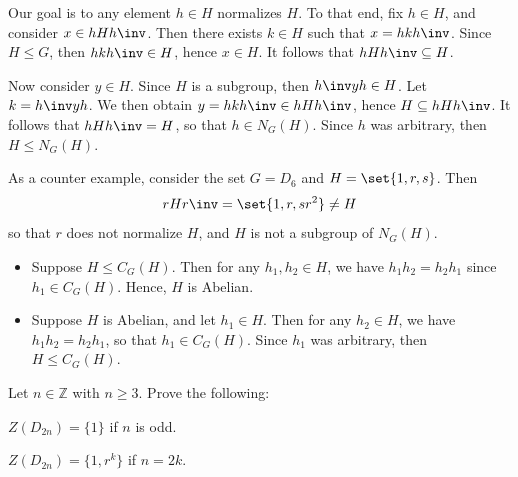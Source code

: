 \begin{solalph}
    \item Our goal is to any element $h \in H$ normalizes $H$. To that end, fix $h \in H$, and consider $x \in hHh\inv$. Then there exists $k \in H$ such that $x = hkh\inv$. Since $H \leq G$, then $hkh\inv \in H$, hence $x \in H$. It follows that $hHh\inv \subseteq H$.
    
    Now consider $y \in H$. Since $H$ is a subgroup, then $h\inv y h \in H$. Let $k = h\inv yh$. We then obtain $y = hkh\inv \in hHh\inv$, hence $H \subseteq hHh\inv$. It follows that $hHh\inv = H$, so that $h \in N_G(H)$. Since $h$ was arbitrary, then $H \leq N_G(H)$.
    
    As a counter example, consider the set $G = D_6$ and $H = \set{1, r, s}$. Then
    \[rHr\inv = \set{1, r, sr^2} \neq H\]
    so that $r$ does not normalize $H$, and $H$ is not a subgroup of $N_G(H)$.
    \item 
    \begin{itemize}
        \item [\rightimp] Suppose $H \leq C_G(H)$. Then for any $h_1, h_2 \in H$, we have $h_1 h_2 = h_2 h_1$ since $h_1 \in C_G(H)$. Hence, $H$ is Abelian.
        \item [\leftimp] Suppose $H$ is Abelian, and let $h_1 \in H$. Then for any $h_2 \in H$, we have $h_1 h_2 = h_2 h_1$, so that $h_1 \in C_G(H)$. Since $h_1$ was arbitrary, then $H \leq C_G(H)$.
    \end{itemize}
\end{solalph}

\begin{exercise} \label{ex2.2.7} 
    Let $n\in\mathbb{Z}$ with $n\ge 3.$ Prove the following:
    \begin{subproblems}
        \item $Z(D_{2n})=\{1\}$ if $n$ is odd.
        \item $Z(D_{2n})=\{1,r^k\}$ if $n=2k.$
    \end{subproblems}
\end{exercise}

